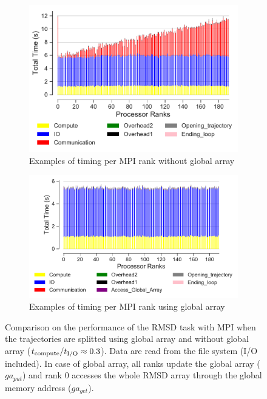 \begin{figure}[ht!]
\begin{subfigure} {.6\textwidth}
  \includegraphics[width=\linewidth]{figures/split-BarPlot-rank-comparison_192_5.pdf}
   \caption{Examples of timing per MPI rank without global array}
  \label{fig:MPIranks-split}
\end{subfigure}
\hfill
\begin{subfigure} {.6\textwidth}
  \includegraphics[width=\linewidth]{figures/split-ga-BarPlot-rank-comparison_192_5.pdf}
  \caption{Examples of timing per MPI rank using global array}
  \label{fig:MPIranks-split-ga}
\end{subfigure}

\caption{Comparison on the performance of the RMSD task with MPI when the trajectories are splitted using global array and without global array (${t}_{\text{compute}}/{t}_{\text{I/O}} \approx 0.3$).
Data are read from the file system (I/O included). In case of global array, all ranks update the global array ($ga_{put}$) and rank 0 accesses the whole RMSD array through the global memory address ($ga_{get}$).}
\label{fig:MPIwithIO-split}
\end{figure}


